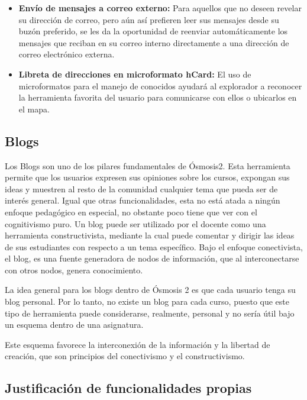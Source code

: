 \begin{itemize}

\item \textbf{Envío de mensajes a correo externo:} Para aquellos que no deseen revelar su dirección de correo, pero aún así prefieren leer sus mensajes desde su buzón preferido, se les da la oportunidad de reenviar automáticamente los mensajes que reciban en su correo interno directamente a una dirección de correo electrónico externa.
\item \textbf{Libreta de direcciones en microformato hCard:} El uso de microformatos para el manejo de conocidos ayudará al explorador a reconocer la herramienta favorita del usuario para comunicarse con ellos o ubicarlos en el mapa.

\end{itemize}


\subsection{Blogs}

Los Blogs son uno de los pilares fundamentales de Ósmosis2. Esta herramienta permite que los usuarios expresen sus opiniones sobre los cursos, expongan sus ideas y muestren al resto de la comunidad cualquier tema que pueda ser de interés general. Igual que otras funcionalidades, esta no está atada a ningún enfoque pedagógico en especial, no obstante poco tiene que ver con el cognitivismo puro. 
Un blog puede ser utilizado por el docente como una herramienta constructivista, mediante la cual puede comentar y dirigir las ideas de sus estudiantes con respecto a un tema específico. Bajo el enfoque conectivista, el blog, es una fuente generadora de nodos de información, que al interconectarse con otros nodos, genera conocimiento.

La idea general para los blogs dentro de Ósmosis 2 es que cada usuario tenga su blog personal. Por lo tanto, no existe un blog para cada curso, puesto que este tipo de herramienta puede considerarse, realmente, personal y no sería útil bajo un esquema dentro de una asignatura.

Este esquema favorece la interconexión de la información y la libertad de creación, que son principios del conectivismo y el constructivismo.

\subsection*{Justificación de funcionalidades propias}

